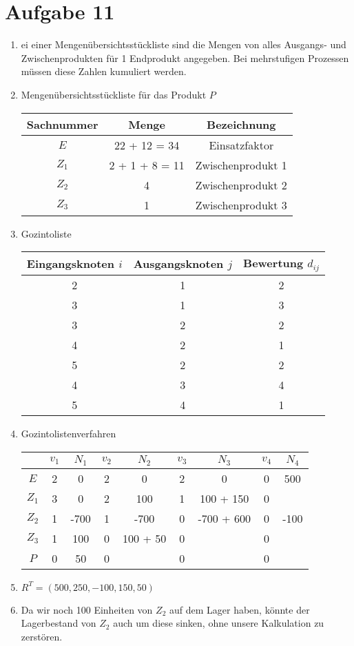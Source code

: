 \documentclass{article}
\begin{document}
	\section*{Aufgabe 11}
	\begin{enumerate}[label=(\alph*)]
		\item ei einer Mengenübersichtsstückliste sind die Mengen von alles Ausgangs- und Zwischenprodukten für 1 Endprodukt angegeben. Bei mehrstufigen Prozessen müssen diese Zahlen kumuliert werden.
		\item Mengenübersichtsstückliste für das Produkt $P$
		\begin{center}
			\begin{tabular}{c|c|c}
				\textbf{Sachnummer} & \textbf{Menge} & \textbf{Bezeichnung} \\
				\hline
				$E$ & 22 + 12 = 34 & Einsatzfaktor \\
				$Z_1$ & 2 + 1 + 8 = 11 & Zwischenprodukt 1 \\
				$Z_2$ & 4 & Zwischenprodukt 2 \\
				$Z_3$ & 1 & Zwischenprodukt 3
			\end{tabular}
		\end{center}
		\item Gozintoliste
		\begin{center}
			\begin{tabular}{c|c|c}
				Eingangsknoten $i$ & Ausgangsknoten $j$ & Bewertung $d_{ij}$ \\
				\hline
				2 & 1 & 2 \\
				3 & 1 & 3 \\
				3 & 2 & 2 \\
				4 & 2 & 1 \\
				5 & 2 & 2 \\
				4 & 3 & 4 \\
				5 & 4 & 1
			\end{tabular}
		\end{center}
		\item Gozintolistenverfahren
		\begin{center}
			\begin{tabular}{c|cc|cc|cc|cc}
				& $v_1$ & $N_1$ & $v_2$ & $N_2$ & $v_3$ & $N_3$ & $v_4$ & $N_4$ \\
				\hline
				$E$ & 2 & 0 & 2 & 0 & 2 & 0 & 0 & 500 \\
				$Z_1$ & 3 & 0 & 2 & 100 & 1 & 100 + 150 & 0 & \\
				$Z_2$ & 1 & -700 & 1 & -700 & 0 & -700 + 600 & 0 & -100 \\
				$Z_3$ & 1 & 100 & 0 & 100 + 50 & 0 & & 0 & \\
				$P$ & 0 & 50 & 0 & & 0 & & 0 & \\
			\end{tabular}
		\end{center}
		\item $R^T=(500,250,-100,150,50)$
		\item Da wir noch 100 Einheiten von $Z_2$ auf dem Lager haben, könnte der Lagerbestand von $Z_2$ auch um diese sinken, ohne unsere Kalkulation zu zerstören.
	\end{enumerate}
	
\end{document}
